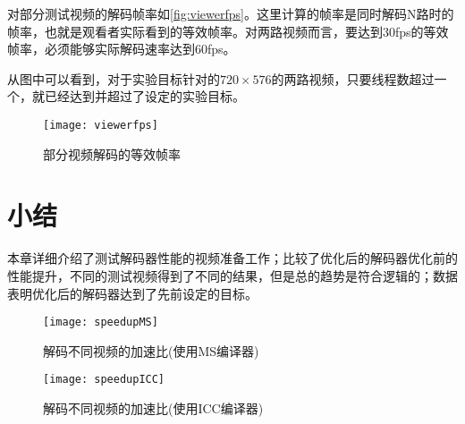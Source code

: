 对部分测试视频的解码帧率如\autoref{fig:viewerfps}。这里计算的帧率是同时解码N路时的帧率，也就是观看者实际看到的等效帧率。对两路视频而言，要达到30fps的等效帧率，必须能够实际解码速率达到60fps。

从图中可以看到，对于实验目标针对的$720\times 576$的两路视频，只要线程数超过一个，就已经达到并超过了设定的实验目标。

\begin{figure}[htbp]
\begin{center}
\texttt{[image: viewerfps]}
\caption{部分视频解码的等效帧率}
\label{fig:viewerfps}
\end{center}
\end{figure}

\section{小结}
\label{sec:sum6}

本章详细介绍了测试解码器性能的视频准备工作；比较了优化后的解码器优化前的性能提升，不同的测试视频得到了不同的结果，但是总的趋势是符合逻辑的；数据表明优化后的解码器达到了先前设定的目标。


\begin{figure}[htbp]
\begin{center}
\texttt{[image: speedupMS]}
\caption{解码不同视频的加速比(使用MS编译器)}
\label{fig:speedupMS2}
\end{center}
\end{figure}


\begin{figure}[htbp]
\begin{center}
\texttt{[image: speedupICC]}
\caption{解码不同视频的加速比(使用ICC编译器)}
\label{fig:speedupICC2}
\end{center}
\end{figure}


\cleardoublepage